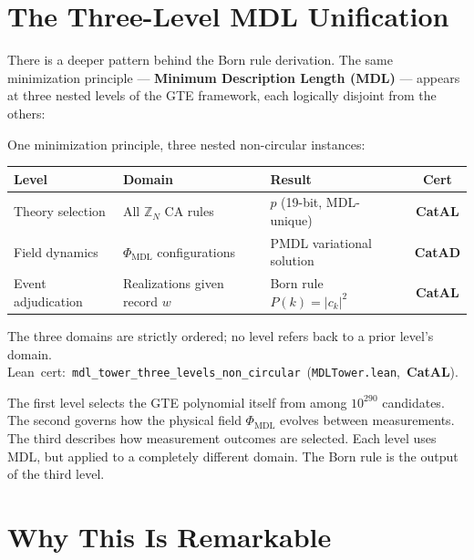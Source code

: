 \documentclass[11pt,a4paper]{article}
\newcommand{\term}[1]{\textbf{#1}}
\newcommand{\lean}[1]{\texttt{#1}}
\newcommand{\PHIMDL}{\Phi_{\mathrm{MDL}}}
\newcommand{\CatAL}{\textbf{CatAL}}
\newcommand{\CatAD}{\textbf{CatAD}}
\begin{document}
\section{The Three-Level MDL Unification}

There is a deeper pattern behind the Born rule derivation.  The same minimization
principle --- \term{Minimum Description Length (MDL)} --- appears at three nested
levels of the GTE framework, each logically disjoint from the others:

\begin{tcolorbox}[colback=boxblue,colframe=blue!40!black,
  title={Three-Level MDL Unification Theorem (\CatAD)},breakable]
One minimization principle, three nested non-circular instances:

\medskip
{\small
\begin{tabular}{@{}p{2.5cm}p{3.5cm}p{4.0cm}c@{}}
\toprule
\textbf{Level} & \textbf{Domain} & \textbf{Result} & \textbf{Cert} \\
\midrule
Theory selection & All $\mathbb{Z}_N$ CA rules & $p$ (19-bit, MDL-unique) & \CatAL \\[4pt]
Field dynamics & $\PHIMDL$ configurations & PMDL variational solution & \CatAD \\[4pt]
Event adjudication & Realizations given record $w$ & Born rule $P(k)=|c_k|^2$ & \CatAL \\
\bottomrule
\end{tabular}
}

\medskip
\noindent
The three domains are strictly ordered; no level refers back to a prior level's domain.\\
\mbox{Lean cert: \lean{mdl\_tower\_three\_levels\_non\_circular} (\texttt{MDLTower.lean}, \CatAL).}
\end{tcolorbox}

\noindent
The first level selects the GTE polynomial itself from among $10^{290}$ candidates.
The second governs how the physical field $\PHIMDL$ evolves between measurements.
The third describes how measurement outcomes are selected.  Each level uses MDL,
but applied to a completely different domain.  The Born rule is the output of the
third level.

\section{Why This Is Remarkable}
\end{document}
